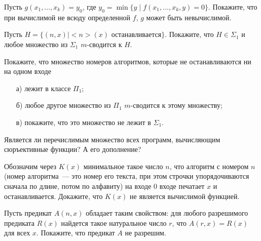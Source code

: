 
\newcommand{\dom}[2]{\left[\frac{#1}{#2}\right]}

\begin{task}
    Пусть $g(x_1, \dots, x_k) = y_0$, где $y_0 = \min \{y \mid f(x_1, \dots, x_k, y) = 0\}$. Покажите, что при вычислимой не всюду
    определенной $f$, $g$ может быть невычислимой.
\end{task}

\begin{task}
	Пусть $H = \{(n, x) \mid {<}n{>}(x) \mbox{ останавливается}\}$. Покажите, что $H \in \Sigma_1$ и любое множество из $\Sigma_1$
    $m$-сводится к $H$.
\end{task}

\begin{task}
	Покажите, что множество номеров алгоритмов, которые не останавливаются ни на одном входе
    \begin{enumerate}[topsep = 0pt, itemsep = -1ex]
        \item [а)] лежит в классе $\Pi_1$;
        \item [б)] любое другое множество из $\Pi_1$ $m$-сводится к этому множеству;
    	\item [в)] покажите, что это множество не лежит в $\Sigma_1$. 
    \end{enumerate}
\end{task}

\begin{task}
    Является ли перечислимым множество всех программ, вычисляющим сюръективные функции? А его дополнение?
\end{task}


\begin{task}
	Обозначим через $K(x)$ минимальное такое число $n$, что алгоритм с номером $n$ (номер алгоритма~--- это номер его текста, при
    этом строчки упорядочиваются сначала по длине, потом по алфавиту) на входе $0$ входе печатает $x$ и останавливается. Докажите,
    что $K(x)$ не является вычислимой функцией.
\end{task}

\begin{task}
	Пусть предикат $A(n, x)$ обладает таким свойством: для любого разрешимого предиката $R(x)$ найдется такое натуральное число
    $r$, что $A(r, x) = R(x)$ для всех $x$. Покажите, что предикат $A$ не разрешим.
\end{task}



\breakline

